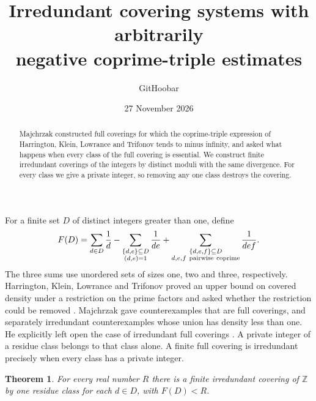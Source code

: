 \documentclass[11pt]{article}
\title{\vspace{-1.5em}Irredundant covering systems with arbitrarily\\ negative coprime-triple estimates}
\author{GitHoobar}
\date{27 November 2026}
\newtheorem{theorem}{Theorem}
\begin{document}
\maketitle
\begin{abstract}
Majchrzak constructed full coverings for which the coprime-triple expression of
Harrington, Klein, Lowrance and Trifonov tends to minus infinity, and asked
what happens when every class of the full covering is essential. We construct
finite irredundant coverings of the integers by distinct moduli with the same
divergence. For every class we give a private integer, so removing any one
class destroys the covering.
\end{abstract}

For a finite set \(D\) of distinct integers greater than one, define
\[
 F(D)=\sum_{d\in D}\frac1d
 -\sum_{\substack{\{d,e\}\subseteq D\\(d,e)=1}}\frac1{de}
 +\sum_{\substack{\{d,e,f\}\subseteq D\\d,e,f\ {\rm pairwise\ coprime}}}\frac1{def}.
\]
The three sums use unordered sets of sizes one, two and three, respectively.
Harrington, Klein, Lowrance and Trifonov proved an upper bound on covered
density under a restriction on the prime factors and asked whether the
restriction could be removed \cite[Theorem 1.9 and Problem 4]{hklt}.
Majchrzak gave counterexamples that are full coverings, and separately
irredundant counterexamples whose union has density less than one.
He explicitly left open the case of irredundant full coverings
\cite[p.~1]{maj}. A private integer of a residue class belongs to that class
alone. A finite full covering is irredundant precisely when every class
has a private integer.

\begin{theorem}
For every real number \(R\) there is a finite irredundant covering of
\(\mathbb Z\) by one residue class for each \(d\in D\), with \(F(D)<R\).
\end{theorem}
\end{document}
